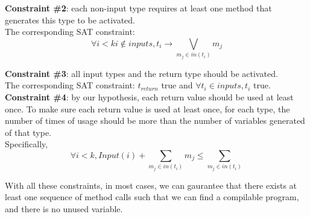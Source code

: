 \documentclass[twocolumn]{article}
\begin{document}
\textbf{Constraint \#2}: each non-input type requires at least one method that generates this type to be activated.\\
The corresponding SAT constraint: $$\forall i < k i \notin inputs, t_i \rightarrow \bigvee_{m_j \in in(t_i)} m_j$$

\textbf{Constraint \#3}: all input types and the return type should be activated. \\
The corresponding SAT constraint: $t_{return}$ true and $\forall t_i \in inputs, t_i$ true.\\

\textbf{Constraint \#4}: by our hypothesis, each return value should be used at least once. To make sure each return value is used at least once, for each type, the number of times of usage should be more than the number of variables generated of that type.\\
Specifically, $$\forall i < k, Input(i) + \sum_{m_j \in in(t_i)}m_j \leqslant \sum_{m_j \in in(t_i)}$$ 

With all these constraints, in most cases, we can gaurantee that there exists at least one sequence of method calls such that we can find a compilable program, and there is no unused variable.\\
\end{document}

